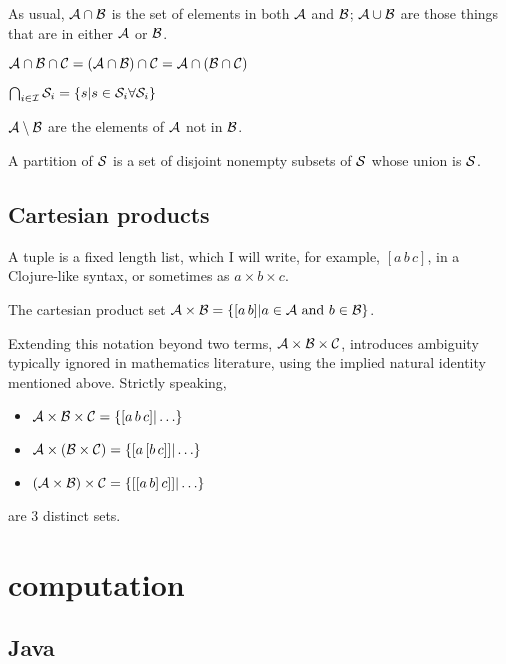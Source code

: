 As usual, $\mathcal{A} \cap \mathcal{B}$ is the set of elements in both 
$\mathcal{A}$ and $\mathcal{B}$; $\mathcal{A} \cup \mathcal{B}$ are those things
that are in either $\mathcal{A}$ or $\mathcal{B}$.

$\mathcal{A} \cap \mathcal{B} \cap \mathcal{C} 
= (\mathcal{A} \cap \mathcal{B}) \cap \mathcal{C} 
= \mathcal{A} \cap (\mathcal{B} \cap \mathcal{C}) $

$\bigcap_{i \in \mathcal{I}} \mathcal{S}_{i} = \{ s | s \in \mathcal{S}_{i}
\forall \mathcal{S}_{i} \}$

$\mathcal{A} \setminus \mathcal{B}$ are the elements of $\mathcal{A}$ 
not in $\mathcal{B}$.

A partition of $\mathcal{S}$ is a set of disjoint nonempty subsets of
$\mathcal{S}$ whose union is $\mathcal{S}$.

\subsection{Cartesian products}

A tuple is a fixed length list, which I will write, for example,
$[a \, b \, c]$, in a Clojure-like syntax,
or sometimes as $a \times b \times c$.

The cartesian product set 
$\mathcal{A} \times \mathcal{B} =
\{[a \, b] | a \in \mathcal{A} \text{ and } b \in \mathcal{B}\}$.

Extending this notation beyond two terms,
$\mathcal{A} \times \mathcal{B} \times \mathcal{C}$,
introduces ambiguity typically ignored in mathematics literature,
using the implied natural identity mentioned above.
Strictly speaking,
\begin{itemize}
  \item $\mathcal{A} \times \mathcal{B} \times \mathcal{C} = 
  \{[a \, b \, c] | \ldots \}$
  \item $\mathcal{A} \times (\mathcal{B} \times \mathcal{C}) = 
  \{[a \, [b \,c]] | \ldots \}$
  \item $(\mathcal{A} \times \mathcal{B}) \times \mathcal{C} = 
  \{[[a \, b] \, c]] | \ldots \}$
\end{itemize}
are 3 distinct sets.

\section{computation}

\subsection{Java}
\lstset{language=Java}

